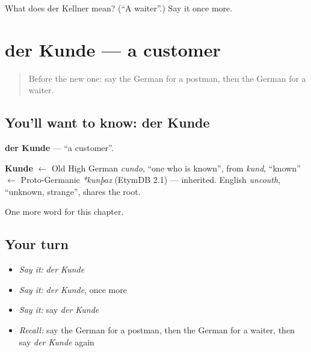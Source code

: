 \begin{tcolorbox}[breakable,colback=teal!4,colframe=teal!35!black,title={Before you move on}]
What does der Kellner mean? (\textquotedblleft{}A waiter\textquotedblright{}.) Say it once more.
\end{tcolorbox}
\section[der Kunde]{der Kunde — a customer}

\label{lesson:GE-C126-kunde}



\begin{quote}
Before the new one: say the German for a postman, then the German for a waiter.
\end{quote}

\subsection*{You'll want to know: der Kunde}
\textbf{der Kunde} — \textquotedblleft{}a customer\textquotedblright{}.

\begin{cousinweb}
\textbf{Kunde} $\leftarrow$ Old High German \emph{cundo}, \textquotedblleft{}one who is known\textquotedblright{}, from \emph{kund}, \textquotedblleft{}known\textquotedblright{} $\leftarrow$ Proto-Germanic \emph{*kunþaz} (EtymDB 2.1) — inherited. English \emph{uncouth}, \textquotedblleft{}unknown, strange\textquotedblright{}, shares the root.
\end{cousinweb}

\begin{grammarlens}[title={What you've built}]
One more word for this chapter.
\end{grammarlens}

\subsection*{Your turn}
\begin{itemize}
\raggedright
  \item \emph{Say it:} \emph{der Kunde}
  \item \emph{Say it:} \emph{der Kunde}, once more
  \item \emph{Say it:} say \emph{der Kunde}
  \item \emph{Recall:} say the German for a postman, then the German for a waiter, then say \emph{der Kunde} again
\end{itemize}

